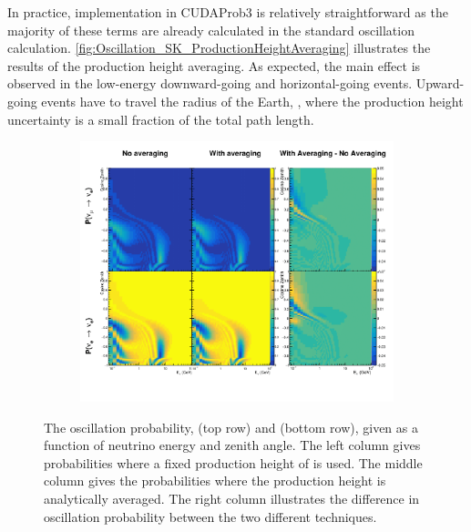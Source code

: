 In practice, implementation in CUDAProb3 \cite{cudaprob3} is relatively straightforward as the majority of these terms are already calculated in the standard oscillation calculation. \autoref{fig:Oscillation_SK_ProductionHeightAveraging} illustrates the results of the production height averaging. As expected, the main effect is observed in the low-energy downward-going and horizontal-going events. Upward-going events have to travel the radius of the Earth, , where the production height uncertainty is a small fraction of the total path length. 

\begin{figure}[h]
  \begin{subfigure}[t]{\textwidth}
    \includegraphics[width=\textwidth, trim={0mm 0mm 0mm 0mm}, clip,page=1]{Figures/Oscillation/ProductionHeightAveraging.pdf}
  \end{subfigure}
  \caption{The oscillation probability,  (top row) and  (bottom row), given as a function of neutrino energy and zenith angle. The left column gives probabilities where a fixed production height of  is used. The middle column gives the probabilities where the production height is analytically averaged. The right column illustrates the difference in oscillation probability between the two different techniques.}
  \label{fig:Oscillation_SK_ProductionHeightAveraging}
\end{figure}
